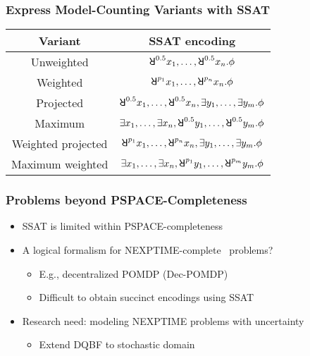 \begin{frame}
      \frametitle{Express Model-Counting Variants with SSAT}
      \begin{table}[t]
            \centering
            \begin{tabular}{c|c}
                  Variant            & SSAT encoding                                                               \\
                  \hline
                  Unweighted         & $\random{0.5}x_1,\ldots,\random{0.5}x_n.\pf$                                \\
                  Weighted           & $\random{p_1}x_1,\ldots,\random{p_n}x_n.\pf$                                \\
                  Projected          & $\random{0.5}x_1,\ldots,\random{0.5}x_n,\exists y_1,\ldots,\exists y_m.\pf$ \\
                  Maximum            & $\exists x_1,\ldots,\exists x_n,\random{0.5}y_1,\ldots,\random{0.5}y_m.\pf$ \\
                  Weighted projected & $\random{p_1}x_1,\ldots,\random{p_n}x_n,\exists y_1,\ldots,\exists y_m.\pf$ \\
                  Maximum weighted   & $\exists x_1,\ldots,\exists x_n,\random{p_1}y_1,\ldots,\random{p_m}y_m.\pf$ \\
            \end{tabular}
      \end{table}
\end{frame}

\begin{frame}
      \frametitle{Problems beyond PSPACE-Completeness}
      \begin{itemize}
            \item SSAT is limited within PSPACE-completeness
                  \pause
            \item A logical formalism for NEXPTIME-complete~\cite{Peterson1979} problems?
                  \begin{itemize}
                        \item E.g., decentralized POMDP (Dec-POMDP)~\cite{Bernstein2002}
                        \item Difficult to obtain succinct encodings using SSAT
                  \end{itemize}
                  \pause
            \item \alert{Research need: modeling NEXPTIME problems with uncertainty}
                  \begin{itemize}
                        \item Extend DQBF to stochastic domain
                  \end{itemize}
      \end{itemize}
\end{frame}

